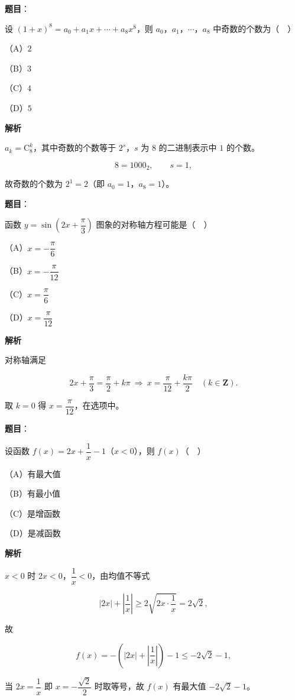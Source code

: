 \begin{answer}

\textbf{题目}：

设 $(1+x)^8=a_0+a_1x+\cdots+a_8x^8$，则 $a_0$，$a_1$，$\cdots$，$a_8$ 中奇数的个数为（　）

（A）$2$

（B）$3$

（C）$4$

（D）$5$

\textbf{解析}

$a_k=\mathrm C_8^k$，其中奇数的个数等于 $2^{s}$，$s$ 为 $8$ 的二进制表示中 $1$ 的个数。

\nopagebreak[4]
\[8=1000_2,\qquad s=1,\]

故奇数的个数为 $2^1=2$（即 $a_0=1$，$a_8=1$）。


\end{answer}
\begin{answer}

\textbf{题目}：

函数 $y=\sin\left(2x+\dfrac{\pi}{3}\right)$ 图象的对称轴方程可能是（　）

（A）$x=-\dfrac{\pi}{6}$

（B）$x=-\dfrac{\pi}{12}$

（C）$x=\dfrac{\pi}{6}$

（D）$x=\dfrac{\pi}{12}$

\textbf{解析}

对称轴满足

\nopagebreak[4]
\[2x+\frac{\pi}3=\frac{\pi}2+k\pi\ \Longrightarrow\ x=\frac{\pi}{12}+\frac{k\pi}2\quad(k\in\mathbf Z).\]

取 $k=0$ 得 $x=\dfrac{\pi}{12}$，在选项中。


\end{answer}
\begin{answer}

\textbf{题目}：

设函数 $f(x)=2x+\dfrac1x-1$（$x<0$），则 $f(x)$（　）

（A）有最大值

（B）有最小值

（C）是增函数

（D）是减函数

\textbf{解析}

$x<0$ 时 $2x<0$，$\dfrac1x<0$，由均值不等式

\nopagebreak[4]
\[|2x|+\left|\frac1x\right|\geqslant2\sqrt{2x\cdot\frac1x}=2\sqrt2,\]

故

\nopagebreak[4]
\[f(x)=-\left(|2x|+\left|\frac1x\right|\right)-1\leqslant-2\sqrt2-1,\]

当 $2x=\dfrac1x$ 即 $x=-\dfrac{\sqrt2}2$ 时取等号，故 $f(x)$ 有最大值 $-2\sqrt2-1$。


\end{answer}

